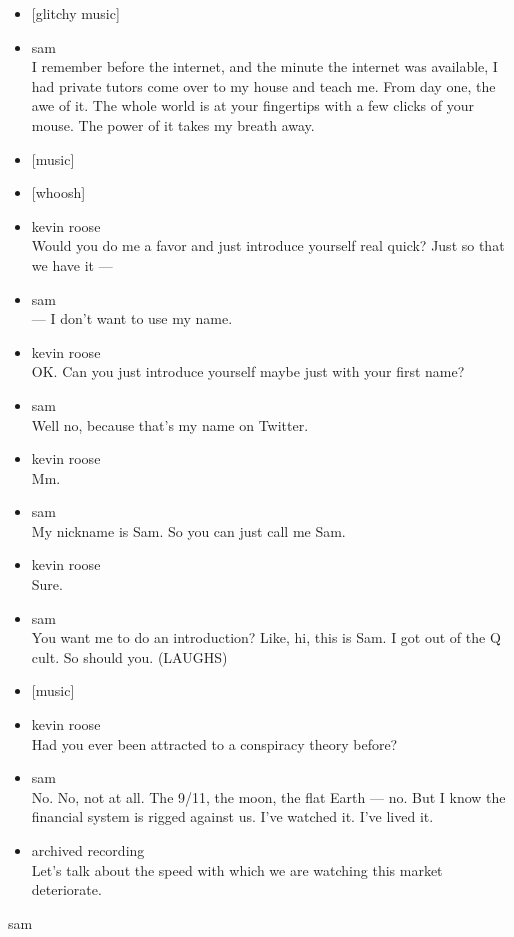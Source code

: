 \begin{itemize}
\item
  {[}glitchy music{]}
\item
  sam\\
  I remember before the internet, and the minute the internet was
  available, I had private tutors come over to my house and teach me.
  From day one, the awe of it. The whole world is at your fingertips
  with a few clicks of your mouse. The power of it takes my breath away.
\item
  {[}music{]}
\item
  {[}whoosh{]}
\item
  kevin roose\\
  Would you do me a favor and just introduce yourself real quick? Just
  so that we have it ---
\item
  sam\\
  --- I don't want to use my name.
\item
  kevin roose\\
  OK. Can you just introduce yourself maybe just with your first name?
\item
  sam\\
  Well no, because that's my name on Twitter.
\item
  kevin roose\\
  Mm.
\item
  sam\\
  My nickname is Sam. So you can just call me Sam.
\item
  kevin roose\\
  Sure.
\item
  sam\\
  You want me to do an introduction? Like, hi, this is Sam. I got out of
  the Q cult. So should you. (LAUGHS)
\item
  {[}music{]}
\item
  kevin roose\\
  Had you ever been attracted to a conspiracy theory before?
\item
  sam\\
  No. No, not at all. The 9/11, the moon, the flat Earth --- no. But I
  know the financial system is rigged against us. I've watched it. I've
  lived it.
\item
  archived recording\\
  Let's talk about the speed with which we are watching this market
  deteriorate.
\end{itemize}

sam

